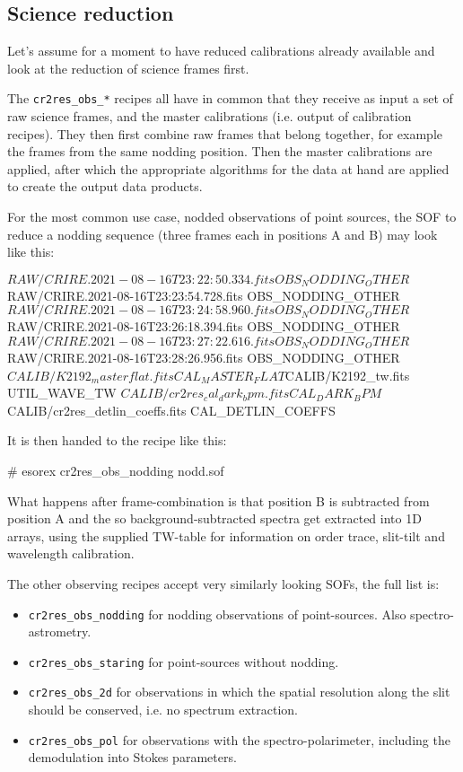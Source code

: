 

\subsection{Science reduction}
\label{sec:sci-reduc}
Let's assume for a moment to have reduced calibrations already available
and look at the reduction of science frames first.

The \texttt{cr2res\_obs\_*} recipes all have in common that they receive as
input a set of raw science frames, and the master calibrations (i.e. output of
calibration recipes). They then first combine raw frames that belong together,
for example the frames from the same nodding position. Then the master
calibrations are applied, after which the appropriate algorithms for the data at
hand are applied to create the output data products.

For the most common use case, nodded observations of point sources,
the SOF to reduce a nodding sequence (three frames  each in positions A and B)
may look like this:
\begin{shell}[fontsize=\small]
$RAW/CRIRE.2021-08-16T23:22:50.334.fits OBS_NODDING_OTHER
$RAW/CRIRE.2021-08-16T23:23:54.728.fits OBS_NODDING_OTHER
$RAW/CRIRE.2021-08-16T23:24:58.960.fits OBS_NODDING_OTHER
$RAW/CRIRE.2021-08-16T23:26:18.394.fits OBS_NODDING_OTHER
$RAW/CRIRE.2021-08-16T23:27:22.616.fits OBS_NODDING_OTHER
$RAW/CRIRE.2021-08-16T23:28:26.956.fits OBS_NODDING_OTHER
$CALIB/K2192_masterflat.fits           CAL_MASTER_FLAT
$CALIB/K2192_tw.fits                   UTIL_WAVE_TW
$CALIB/cr2res_cal_dark_bpm.fits        CAL_DARK_BPM
$CALIB/cr2res_detlin_coeffs.fits       CAL_DETLIN_COEFFS
\end{shell}

It is then handed to the recipe like this:
\begin{shell}[fontsize=\small]
    # esorex cr2res_obs_nodding nodd.sof
\end{shell}

What happens after frame-combination is that position B is subtracted from
position A and the so background-subtracted spectra get extracted into 1D
arrays, using the supplied TW-table for information on order trace, slit-tilt
and wavelength calibration.

The other observing recipes accept very similarly looking SOFs, the full list
is:
\begin{itemize}
    \item \texttt{cr2res\_obs\_nodding} for nodding observations of
        point-sources. Also spectro-astrometry.
    \item \texttt{cr2res\_obs\_staring} for point-sources without nodding.
    \item \texttt{cr2res\_obs\_2d} for observations in which the spatial
        resolution along the slit should be conserved, i.e. no spectrum extraction.
    \item \texttt{cr2res\_obs\_pol} for observations with the
        spectro-polarimeter, including the demodulation into Stokes parameters. 
\end{itemize}


